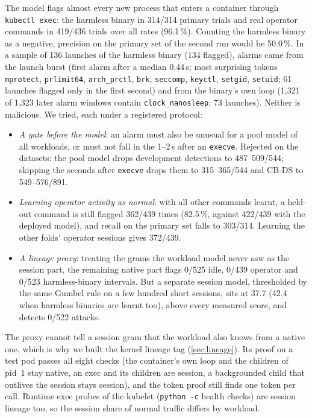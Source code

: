 The model flags almost every new process that enters a container through \texttt{kubectl exec}: the harmless binary
in 314/314 primary trials and real operator commands in 419/436 trials over all rates (96.1\,\%). Counting the harmless
binary as a negative, precision on the primary set of the second run would be 50.0\,\%. In a sample of 136 launches of
the harmless binary (134 flagged), alarms came from the launch burst (first alarm after a median 0.44\,s; most
surprising tokens \texttt{mprotect}, \texttt{prlimit64}, \texttt{arch\_prctl}, \texttt{brk}, \texttt{seccomp},
\texttt{keyctl}, \texttt{setgid}, \texttt{setuid}; 61 launches flagged only in the first second) and from the binary's
own loop (1{,}321 of 1{,}323 later alarm windows contain \texttt{clock\_nanosleep}; 73 launches). Neither is malicious.
We tried, each under a registered protocol:
\begin{itemize}
\item \emph{A gate before the model}: an alarm must also be unusual for a pool model of all workloads, or must not fall
  in the 1--2\,s after an \texttt{execve}. Rejected on the datasets: the pool model drops development detections to
  487--509/544; skipping the seconds after \texttt{execve} drops them to 315--365/544 and CB-DS to 549--576/891.
\item \emph{Learning operator activity as normal}: with all other commands learnt, a held-out command is still flagged
  362/439 times (82.5\,\%, against 422/439 with the deployed model), and recall on the primary set falls to 303/314.
  Learning the other folds' operator sessions gives 372/439.
\item \emph{A lineage proxy}: treating the grams the workload model never saw as the session part, the remaining native
  part flags 0/525 idle, 0/439 operator and 0/523 harmless-binary intervals. But a separate session model, thresholded
  by the same Gumbel rule on a few hundred short sessions, sits at 37.7 (42.4 when harmless binaries are learnt too),
  above every measured score, and detects 0/522 attacks.
\end{itemize}
The proxy cannot tell a session gram that the workload also knows from a native one, which is why we built the kernel
lineage tag (\cref{sec:lineage}). Its proof on a test pod passes all eight checks (the container's own loop and the
children of pid~1 stay native, an exec and its children are session, a backgrounded child that outlives the session
stays session), and the token proof still finds one token per call. Runtime exec probes of the kubelet (\texttt{python -c} health checks) are session lineage too, so the
session share of normal traffic differs by workload.

